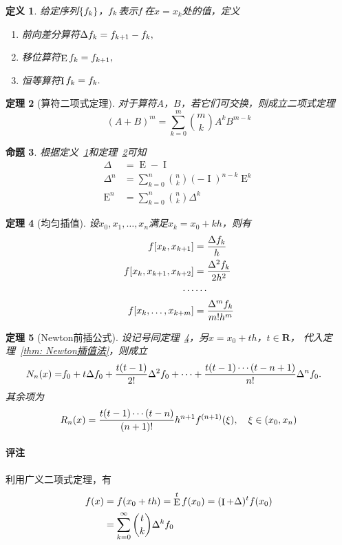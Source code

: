 \documentclass[12pt, a4paper]{article}
\theoremstyle{margin}
\newtheorem{thm}{定理}
\newtheorem{pos}[thm]{命题}
\newtheorem{defi}[thm]{定义}
\DeclareMathOperator{\sft}{E}
\DeclareMathOperator{\idt}{I}
\newcommand{\f}{\mathnormal{f}}
\newcommand{\R}{\mathbf{R}}
\newcommand\thmref[1]{定理~\ref{#1}}
\newcommand\defref[1]{定义~\ref{#1}}
\newcommand{\remark}{\paragraph{评注}}
\begin{document}
  \begin{defi}
    \label{def: 算符}
    给定序列$\{\f_k\}$，$\f_k$表示$\f$在$x=x_k$处的值，定义
    \begin{enumerate}
      \item 前向差分算符$\Delta\f_k = \f_{k+1} - \f_k,$
      \item 移位算符$\sft\f_k = \f_{k+1},$
      \item 恒等算符$\idt\f_k = \f_k.$
    \end{enumerate}
  \end{defi}

  \begin{thm}[算符二项式定理]
    \label{thm: 算符二项式定理}
    对于算符$A$，$B$，若它们可交换，则成立二项式定理
    \[
      (A+B)^m = \sum_{k=0}^m \binom{m}{k} A^kB^{m-k}
    \]
  \end{thm}

  \begin{pos}
    根据\defref{def: 算符}和\thmref{thm: 算符二项式定理}可知
    \[\begin{split}
      \Delta &= \sft - \idt \\
      \Delta^n &= \sum_{k=0}^n\binom{n}{k}(-\idt)^{n-k}\sft^k \\
      \sft^n &= \sum_{k=0}^n\binom{n}{k}\Delta^k
    \end{split}\]
  \end{pos}

  \begin{thm}[均匀插值]
    \label{thm: 均匀插值}
    设$x_0,x_1,\dots,x_n$满足$x_k = x_0 + kh$，则有
    \[\begin{split}
      \f[x_k, x_{k+1}] &= \frac{\Delta\f_k}{h} \\
      \f[x_k, x_{k+1}, x_{k+2}] &=
      \frac{\Delta^2\f_k}{2h^2} \\
      \cdots & \cdots \\
      \f[x_k, \dots,x_{k+m}] &=
      \frac{\Delta^m\f_k}{m!h^m} \\
    \end{split}\]
  \end{thm}

  \begin{thm}[Newton前插公式]
    设记号同\thmref{thm: 均匀插值}，另$x = x_0 + th$，$t\in\R$，
    代入\thmref{thm: Newton插值法}，则成立
    \[\begin{split}
      N_n(x) =& \f_0 + t\Delta\f_0 + \frac{t(t-1)}{2!}\Delta^2\f_0 + \cdots + \frac{t(t-1)\cdots(t-n+1)}{n!}\Delta^n\f_0.
    \end{split}\]
    其余项为
    \[
      R_n(x) = \frac{t(t-1)\cdots(t-n)}{(n+1)!}h^{n+1}\f^{(n+1)}(\xi),
      \quad \xi\in(x_0, x_n)
    \]
  \end{thm}
  \remark
    利用广义二项式定理，有
    \[\begin{split}
      \f(x) &= \f(x_0 + th) = \sft^t\f(x_0) = (\idt+\Delta)^t\f(x_0) \\
      &= \sum_{k=0}^\infty\binom{t}{k}\Delta^k\f_0
    \end{split}\]
\end{document}
